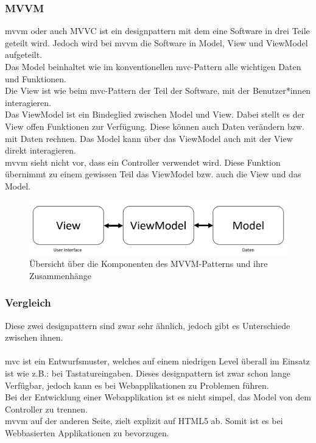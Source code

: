 \subsubsection{MVVM}
\Gls{mvvm} oder auch MVVC ist ein \Gls{designpattern} mit dem eine Software in drei Teile geteilt wird.\cite{mvvm_vue} Jedoch wird bei \Gls{mvvm} die Software in Model, View und ViewModel aufgeteilt.\\
Das Model beinhaltet wie im konventionellen \Gls{mvc}-Pattern alle wichtigen Daten und Funktionen.\\
Die View ist wie beim \Gls{mvc}-Pattern der Teil der Software, mit der Benutzer*innen interagieren.\\
Das ViewModel ist ein Bindeglied zwischen Model und View. Dabei stellt es der View offen Funktionen zur Verfügung. Diese können auch Daten verändern bzw. mit Daten rechnen. Das Model kann über das ViewModel auch mit der View direkt interagieren.\\
\Gls{mvvm} sieht nicht vor, dass ein Controller verwendet wird. Diese Funktion übernimmt zu einem gewissen Teil das ViewModel bzw. auch die View und das Model.
\begin{figure}[H]
	\centering
	\includegraphics[width=0.8\linewidth]{images/mvvm}
	\caption[Übersicht des MVVM-Patterns]{Übersicht über die Komponenten des MVVM-Patterns und ihre Zusammenhänge}
	\label{fig:mvvm}
\end{figure}
\newpage
\subsubsection{Vergleich}
Diese zwei \Gls{designpattern} sind zwar sehr ähnlich, jedoch gibt es Unterschiede zwischen ihnen.\\\\
\Gls{mvc} ist ein Entwurfsmuster, welches auf einem niedrigen Level überall im Einsatz ist wie z.B.: bei Tastatureingaben\cite{mvc}. Dieses \Gls{designpattern} ist zwar schon lange Verfügbar, jedoch kann es bei Webapplikationen zu Problemen führen.\\
Bei der Entwicklung einer Webapplikation ist es nicht simpel, das Model von dem Controller zu trennen.\\
\Gls{mvvm} auf der anderen Seite, zielt explizit auf HTML5 ab\cite{mvvm_vue}. Somit ist es bei Webbasierten Applikationen zu bevorzugen.
